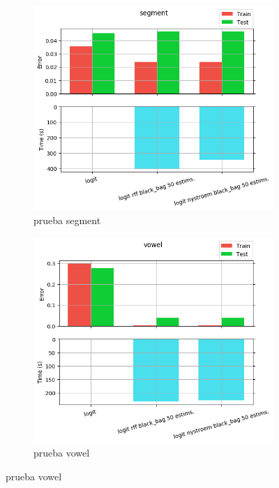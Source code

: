 \begin{figure}[ht]
  \centering
  \begin{subfigure}[b]{0.5\linewidth}
    \centering\includegraphics[width=\imgscale\linewidth]{Figures/2_2/segment}
    \caption{prueba segment}
    \label{fig:2_2_segment}
  \end{subfigure}%
  \begin{subfigure}[b]{0.5\linewidth}
    \centering\includegraphics[width=\imgscale\linewidth]{Figures/2_2/vowel}
    \caption{prueba vowel}
    \label{fig:2_2_vowel}
  \end{subfigure}
\end{figure}
